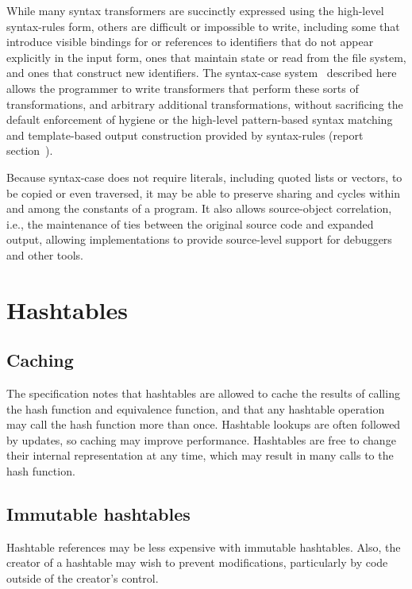 \documentclass[twoside,twocolumn]{algol60}
\begin{document}
\begin{rationale}
While many syntax transformers are succinctly expressed using the
high-level {\cf syntax-rules} form, others are difficult or impossible
to write, including some that introduce visible bindings for or references
to identifiers that do not appear explicitly in the input form, ones that
maintain state or read from the file system, and ones that construct new
identifiers.
The {\cf syntax-case} system~\cite{syntacticabstraction} described here
allows the programmer to write transformers that perform these sorts of
transformations, and arbitrary additional transformations, without
sacrificing the default enforcement of hygiene or the high-level
pattern-based syntax matching and template-based output construction
provided by {\cf syntax-rules} (report
section~).

Because {\cf syntax-case} does not require literals, including quoted
lists or vectors, to be copied or even traversed, it may be able to preserve sharing
and cycles within and among the constants of a program.  It also
allows source-object correlation, i.e., the maintenance of ties
between the original source code and expanded output, allowing
implementations to provide source-level support for debuggers and
other tools.
\end{rationale}

\chapter{Hashtables}

\section{Caching}

The specification notes that hashtables are allowed to cache the
results of calling the hash function and equivalence function, and
that any hashtable operation may call the hash function more than
once.  Hashtable lookups are often followed by updates, so caching may
improve performance.  Hashtables are free to change their internal
representation at any time, which may result in many calls to the hash
function.

\section{Immutable hashtables}

Hashtable references may be less expensive with immutable hashtables.
Also, the creator of a hashtable may wish to prevent 
modifications, particularly by code outside of the creator's 
control.
\end{document}
